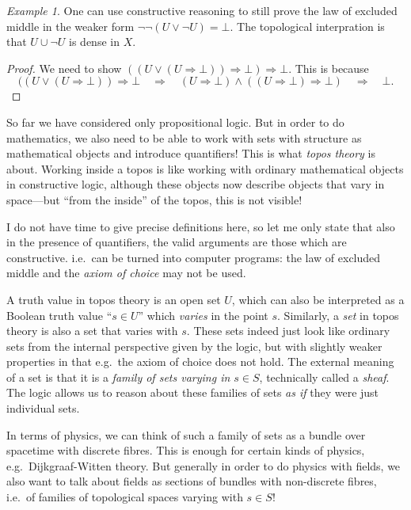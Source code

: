 \documentclass[11pt, oneside, article]{memoir}
\theoremstyle{plain}
\theoremstyle{definition}
\theoremstyle{remark}
\newtheorem{example}[theorem]{Example}
\newcommand{\imp}{\Rightarrow}
\begin{document}
\begin{example}
One can use constructive reasoning to still prove the law of excluded middle in the weaker form $\lnot\lnot(U \lor \lnot U) = \bot$. The topological interpration is that $U \cup \lnot U$ is dense in $X$.
\end{example}

\begin{proof}
	We need to show $((U \lor (U \imp \bot)) \imp \bot) \imp \bot$. This is because
	\[
		((U \lor (U \imp \bot)) \imp \bot \quad \Longrightarrow \quad (U \imp \bot) \land ((U \imp \bot) \imp \bot) \quad \Longrightarrow \quad \bot.
	\]
\end{proof}

So far we have considered only propositional logic. But in order to do mathematics, we also need to be able to work with sets with structure as mathematical objects and introduce quantifiers! This is what \emph{topos theory} is about. Working inside a topos is like working with ordinary mathematical objects in constructive logic, although these objects now describe objects that vary in space---but ``from the inside'' of the topos, this is not visible!

I do not have time to give precise definitions here, so let me only state that also in the presence of quantifiers, the valid arguments are those which are constructive. i.e.~can be turned into computer programs: the law of excluded middle and the \emph{axiom of choice} may not be used.

A truth value in topos theory is an open set $U$, which can also be interpreted as a Boolean truth value ``$s\in U$'' which \emph{varies} in the point $s$. Similarly, a \emph{set} in topos theory is also a set that varies with $s$. These sets indeed just look like ordinary sets from the internal perspective given by the logic, but with slightly weaker properties in that e.g.~the axiom of choice does not hold. The external meaning of a set is that it is a \emph{family of sets varying in $s\in S$}, technically called a \emph{sheaf}. The logic allows us to reason about these families of sets \emph{as if} they were just individual sets.

In terms of physics, we can think of such a family of sets as a bundle over spacetime with discrete fibres. This is enough for certain kinds of physics, e.g.~Dijkgraaf-Witten theory. But generally in order to do physics with fields, we also want to talk about fields as sections of bundles with non-discrete fibres, i.e.~of families of topological spaces varying with $s \in S$!
\end{document}
